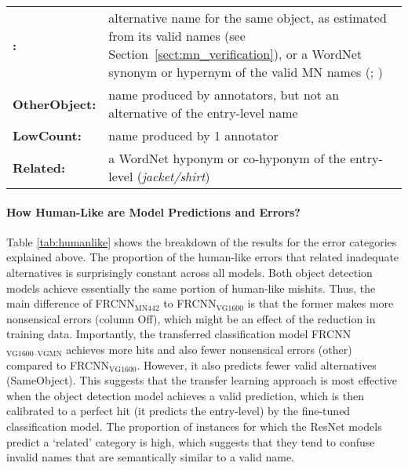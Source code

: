 \begin{tabularx}{.47\textwidth}{@{~}lX}
	\textbf{\sameobject:} & alternative name for the same object, as estimated from its valid \mn names (see Section~\ref{sect:mn_verification}), or a WordNet synonym or hypernym of the valid MN names (\name{house/building}; \citealt{fellbaum1998wordnet})\\
	\textbf{OtherObject:} & name produced by annotators, but not an alternative of the entry-level name \\
	\textbf{LowCount:} & name produced by 1 annotator\\
	\textbf{Related:}& a WordNet hyponym or co-hyponym of the entry-level (\textit{jacket/shirt})\
\end{tabularx}


\paragraph{How Human-Like are Model Predictions and Errors?}

Table \ref{tab:humanlike} shows the breakdown of the results for the error categories explained above. 
The proportion of the human-like errors that related inadequate alternatives is surprisingly constant across all models.
Both object detection models achieve essentially the same portion of human-like mishits. Thus, the main difference of FRCNN$_{\text{MN442}}$ to  FRCNN$_{\text{VG1600}}$ is that the former makes more nonsensical errors (column Off), which might be an effect of the reduction in training data.
Importantly, the transferred classification model FRCNN$_{\text{VG1600--VGMN}}$ achieves more hits and also fewer nonsensical errors (other) compared to FRCNN$_{\text{VG1600}}$.
However, it also predicts fewer valid alternatives (SameObject).
This suggests that the transfer learning approach is most effective when the object detection model achieves a valid prediction, which is then calibrated to a perfect hit (it predicts the entry-level) by the fine-tuned classification model.
The proportion of instances for which the ResNet models predict a `related' category is high, which suggests that they tend to confuse invalid names that are semantically similar to a valid name. 

